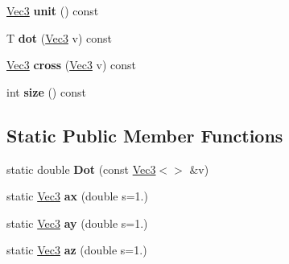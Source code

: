\begin{DoxyCompactItemize}
\item 
\hypertarget{classvsr_1_1_vec3_a1d338e68276089f8def5ee4b7a777516}{\hyperlink{classvsr_1_1_vec3}{Vec3} {\bfseries unit} () const }\label{classvsr_1_1_vec3_a1d338e68276089f8def5ee4b7a777516}

\item 
\hypertarget{classvsr_1_1_vec3_a75e0c7bd5726395fe65d033221209675}{T {\bfseries dot} (\hyperlink{classvsr_1_1_vec3}{Vec3} v) const }\label{classvsr_1_1_vec3_a75e0c7bd5726395fe65d033221209675}

\item 
\hypertarget{classvsr_1_1_vec3_af8fce522e45e7207fef7b1b6231c7330}{\hyperlink{classvsr_1_1_vec3}{Vec3} {\bfseries cross} (\hyperlink{classvsr_1_1_vec3}{Vec3} v) const }\label{classvsr_1_1_vec3_af8fce522e45e7207fef7b1b6231c7330}

\item 
\hypertarget{classvsr_1_1_vec3_af10de45196ebc0e70117a78db6716f51}{int {\bfseries size} () const }\label{classvsr_1_1_vec3_af10de45196ebc0e70117a78db6716f51}

\end{DoxyCompactItemize}
\subsection*{Static Public Member Functions}
\begin{DoxyCompactItemize}
\item 
\hypertarget{classvsr_1_1_vec3_aa2e6402bdb36a21b2e9aca4e97086e1b}{static double {\bfseries Dot} (const \hyperlink{classvsr_1_1_vec3}{Vec3}$<$$>$ \&v)}\label{classvsr_1_1_vec3_aa2e6402bdb36a21b2e9aca4e97086e1b}

\item 
\hypertarget{classvsr_1_1_vec3_a7342e77e71e6d02d8152028898fcb249}{static \hyperlink{classvsr_1_1_vec3}{Vec3} {\bfseries ax} (double s=1.)}\label{classvsr_1_1_vec3_a7342e77e71e6d02d8152028898fcb249}

\item 
\hypertarget{classvsr_1_1_vec3_a36366fa37a41eb87cfebba0bc785cb74}{static \hyperlink{classvsr_1_1_vec3}{Vec3} {\bfseries ay} (double s=1.)}\label{classvsr_1_1_vec3_a36366fa37a41eb87cfebba0bc785cb74}

\item 
\hypertarget{classvsr_1_1_vec3_aadd6222c25e2957e6b8547f7d2a24a67}{static \hyperlink{classvsr_1_1_vec3}{Vec3} {\bfseries az} (double s=1.)}\label{classvsr_1_1_vec3_aadd6222c25e2957e6b8547f7d2a24a67}

\end{DoxyCompactItemize}
